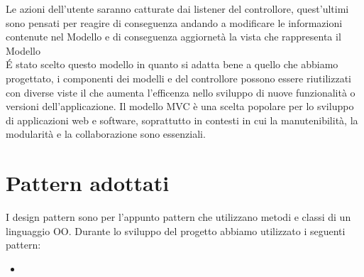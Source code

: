\documentclass[a4paper, 11pt,oneside]{book}
\newcommand{\spacing}{\par\bigskip\noindent}
\begin{document}
    Le azioni dell'utente saranno catturate dai listener del controllore, quest'ultimi sono pensati per reagire di conseguenza andando a modificare le informazioni contenute nel Modello e di conseguenza aggiornetà la vista che rappresenta il Modello\\
    \'E stato scelto questo modello in quanto si adatta bene a quello che abbiamo progettato, i componenti dei modelli e del controllore possono essere riutilizzati con diverse viste il che aumenta l'efficenza nello sviluppo di nuove funzionalità o versioni dell'applicazione. Il modello MVC è una scelta popolare per lo sviluppo di applicazioni web 
    e software, soprattutto in contesti in cui la manutenibilità, la modularità e la collaborazione sono essenziali.
    \spacing
    

\chapter{Pattern adottati}
    I design pattern sono per l'appunto pattern che utilizzano metodi e classi di un linguaggio OO. Durante lo sviluppo del progetto abbiamo utilizzato i seguenti pattern:
    \begin{itemize}
        \item 
    \end{itemize}
\end{document}
